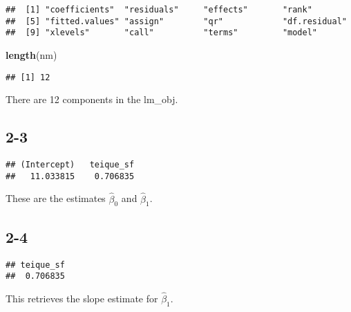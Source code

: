 \documentclass[
]{article}
\newenvironment{Shaded}{\begin{snugshade}}{\end{snugshade}}
\newcommand{\FunctionTok}[1]{\textcolor[rgb]{0.13,0.29,0.53}{\textbf{#1}}}
\newcommand{\NormalTok}[1]{#1}
\newcommand{\SpecialCharTok}[1]{\textcolor[rgb]{0.81,0.36,0.00}{\textbf{#1}}}
\newcommand{\StringTok}[1]{\textcolor[rgb]{0.31,0.60,0.02}{#1}}
\begin{document}
\begin{verbatim}
##  [1] "coefficients"  "residuals"     "effects"       "rank"         
##  [5] "fitted.values" "assign"        "qr"            "df.residual"  
##  [9] "xlevels"       "call"          "terms"         "model"
\end{verbatim}

\begin{Shaded}
\begin{Highlighting}[]
\FunctionTok{length}\NormalTok{(nm)}
\end{Highlighting}
\end{Shaded}

\begin{verbatim}
## [1] 12
\end{verbatim}

There are 12 components in the lm\_obj.

\subsection{2-3}\label{section-6}

\begin{Shaded}
\end{Shaded}

\begin{verbatim}
## (Intercept)   teique_sf 
##   11.033815    0.706835
\end{verbatim}

These are the estimates \(\hat{\beta}_0\) and \(\hat{\beta}_1\).

\subsection{2-4}\label{section-7}

\begin{Shaded}
\end{Shaded}

\begin{verbatim}
## teique_sf 
##  0.706835
\end{verbatim}

This retrieves the slope estimate for \(\hat{\beta}_1\).
\end{document}
